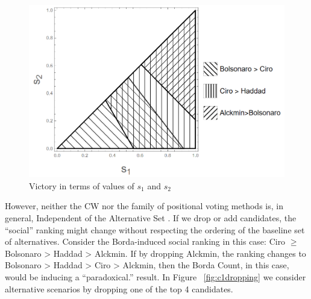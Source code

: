 \documentclass[hidelinks,11pt]{article}
\begin{document}
\begin{figure}[H]
 \centering
 \includegraphics[width=\columnwidth,
 height=0.3\textheight]{./images/counterfactual_triangle.png}
\caption{Victory in terms of values of \(s_{1}\) and \(s_{2}\)}
 \label{fig:positional4c}
\end{figure}


However, neither the CW nor the family of positional voting methods is, in
general, Independent of the Alternative Set \parencite{kaminski2015empirical}.
If we drop or add candidates, the ``social'' ranking might change without
respecting the ordering of the baseline set of alternatives. Consider the
Borda-induced social ranking in this case: Ciro \( \geq \) Bolsonaro > Haddad >
Alckmin. If by dropping Alckmin, the ranking changes to Bolsonaro > Haddad >
Ciro > Alckmin, then the Borda Count, in this case, would be inducing a
``paradoxical.'' result. In Figure ~\ref{fig:c1dropping} we consider alternative
scenarios by dropping one of the top 4 candidates.
\end{document}
